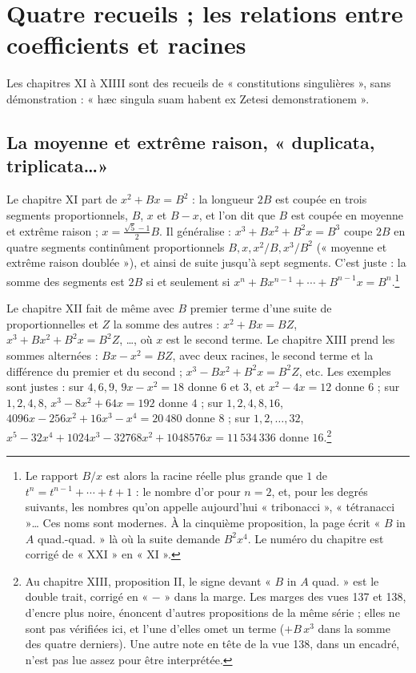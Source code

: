 \documentclass[11pt,a4paper]{article}
\begin{document}
\section*{Quatre recueils ; les relations entre coefficients et racines}

Les chapitres XI à XIIII sont des recueils de « constitutions singulières »,
sans démonstration : « hæc singula suam habent ex Zetesi demonstrationem ».

\subsection*{La moyenne et extrême raison, « duplicata, triplicata\ldots »}

Le chapitre XI part de $x^2 + Bx = B^2$ : la longueur $2B$ est coupée en trois
segments proportionnels, $B$, $x$ et $B - x$, et l'on dit que $B$ est coupée en
moyenne et extrême raison ; $x = \tfrac{\sqrt5 - 1}{2}B$. Il généralise :
$x^3 + Bx^2 + B^2x = B^3$ coupe $2B$ en quatre segments continûment
proportionnels $B, x, x^2/B, x^3/B^2$ (« moyenne et extrême raison
doublée »), et ainsi de suite jusqu'à sept segments. C'est juste : la somme des
segments est $2B$ si et seulement si $x^n + Bx^{n-1} + \cdots + B^{n-1}x = B^n$.\footnote{Le
rapport $B/x$ est alors la racine réelle plus grande que $1$ de
$t^n = t^{n-1} + \cdots + t + 1$ : le nombre d'or pour $n = 2$, et, pour les degrés
suivants, les nombres qu'on appelle aujourd'hui « tribonacci »,
« tétranacci »\ldots{} Ces noms sont modernes. À la cinquième proposition, la page
écrit « $B$ in $A$ quad.-quad. » là où la suite demande $B^2x^4$. Le numéro du
chapitre est corrigé de « XXI » en « XI ».}

Le chapitre XII fait de même avec $B$ premier terme d'une suite de
proportionnelles et $Z$ la somme des autres : $x^2 + Bx = BZ$,
$x^3 + Bx^2 + B^2x = B^2Z$, \ldots, où $x$ est le second terme. Le chapitre XIII
prend les sommes alternées : $Bx - x^2 = BZ$, avec deux racines, le second terme
et la différence du premier et du second ; $x^3 - Bx^2 + B^2x = B^2Z$, etc. Les
exemples sont justes : sur $4, 6, 9$, $9x - x^2 = 18$ donne $6$ et $3$, et
$x^2 - 4x = 12$ donne $6$ ; sur $1, 2, 4, 8$, $x^3 - 8x^2 + 64x = 192$ donne $4$ ;
sur $1, 2, 4, 8, 16$, $4096x - 256x^2 + 16x^3 - x^4 = 20\,480$ donne $8$ ; sur
$1, 2, \ldots, 32$, $x^5 - 32x^4 + 1024x^3 - 32768x^2 + 1048576x = 11\,534\,336$ donne
$16$.\footnote{Au chapitre XIII, proposition II, le signe devant « $B$ in $A$
quad. » est le double trait, corrigé en « $-$ » dans la marge. Les marges des vues
137 et 138, d'encre plus noire, énoncent d'autres propositions de la même
série ; elles ne sont pas vérifiées ici, et l'une d'elles omet un terme
($+B\,x^3$ dans la somme des quatre derniers). Une autre note en tête de la
vue 138, dans un encadré, n'est pas lue assez pour être interprétée.}
\end{document}
